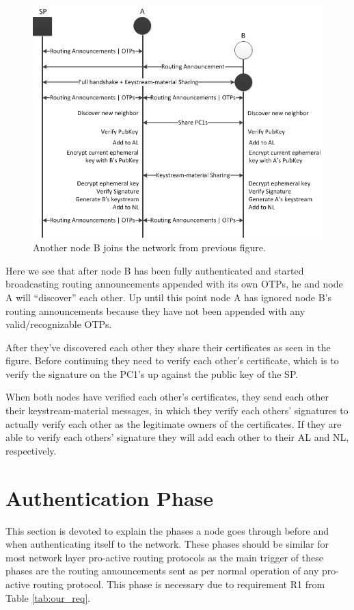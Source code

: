 \begin{figure}[ht!]
	\centering
  	\includegraphics[width=\textwidth]{images/simple_example_msc_2.png}
  	\caption{Another node B joins the network from previous figure.}
	\label{fig:simple_example_msc_2}
\end{figure}

Here we see that after node B has been fully authenticated and started
broadcasting routing announcements appended with its own \acp{OTP}, he and node
A will ``discover'' each other. Up until this point node A has ignored node B's
routing announcements because they have not been appended with any
valid/recognizable \acp{OTP}.

After they've discovered each other they share their certificates as seen in the
figure. Before continuing they need to verify each other's certificate, which is
to verify the signature on the \ac{PC1}'s up against the public key of the
\ac{SP}.

When both nodes have verified each other's certificates, they send each other
their keystream-material messages, in which they verify each others' signatures
to actually verify each other as the legitimate owners of the certificates. If
they are able to verify each others' signature they will add each other to their
\ac{AL} and \ac{NL}, respectively.

\section{Authentication Phase}
This section is devoted to explain the phases a node goes through before and
when authenticating itself to the network. These phases should be similar for
most network layer pro-active routing protocols as the main trigger of these
phases are the routing announcements sent as per normal operation of any
pro-active routing protocol. This phase is necessary due to requirement R1 from
Table \ref{tab:our_req}.

